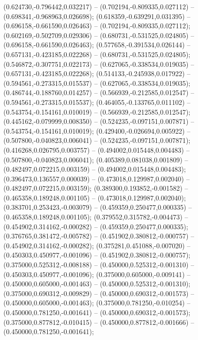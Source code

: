  (0.624730,-0.796442,0.032217) -- (0.702194,-0.809335,0.027112) -- (0.698341,-0.968963,0.026698);
 (0.618359,-0.639291,0.031395) -- (0.696158,-0.661590,0.026463) -- (0.702194,-0.809335,0.027112);
 (0.602169,-0.502709,0.029306) -- (0.680731,-0.531525,0.024805) -- (0.696158,-0.661590,0.026463);
 (0.577658,-0.391534,0.026144) -- (0.657131,-0.423185,0.022268) -- (0.680731,-0.531525,0.024805);
 (0.546872,-0.307751,0.022173) -- (0.627065,-0.338534,0.019035) -- (0.657131,-0.423185,0.022268);
 (0.514133,-0.245938,0.017922) -- (0.594561,-0.273315,0.015537) -- (0.627065,-0.338534,0.019035);
 (0.486744,-0.188760,0.014257) -- (0.566939,-0.212585,0.012547) -- (0.594561,-0.273315,0.015537);
 (0.464055,-0.133765,0.011102) -- (0.543754,-0.154161,0.010019) -- (0.566939,-0.212585,0.012547);
 (0.445162,-0.079999,0.008350) -- (0.524235,-0.097151,0.007871) -- (0.543754,-0.154161,0.010019);
 (0.429400,-0.026694,0.005922) -- (0.507800,-0.040823,0.006041) -- (0.524235,-0.097151,0.007871);
 (0.416268,0.026795,0.003757) -- (0.494002,0.015448,0.004483) -- (0.507800,-0.040823,0.006041);
 (0.405389,0.081038,0.001809) -- (0.482497,0.072215,0.003159) -- (0.494002,0.015448,0.004483);
 (0.396473,0.136557,0.000039) -- (0.473018,0.129987,0.002040) -- (0.482497,0.072215,0.003159);
 (0.389300,0.193852,-0.001582) -- (0.465358,0.189248,0.001105) -- (0.473018,0.129987,0.002040);
 (0.383701,0.253423,-0.003079) -- (0.459359,0.250477,0.000335) -- (0.465358,0.189248,0.001105);
 (0.379552,0.315782,-0.004473) -- (0.454902,0.314162,-0.000282) -- (0.459359,0.250477,0.000335);
 (0.376765,0.381472,-0.005782) -- (0.451902,0.380812,-0.000757) -- (0.454902,0.314162,-0.000282);
 (0.375281,0.451088,-0.007020) -- (0.450303,0.450977,-0.001096) -- (0.451902,0.380812,-0.000757);
 (0.375000,0.525312,-0.008188) -- (0.450000,0.525312,-0.001310) -- (0.450303,0.450977,-0.001096);
 (0.375000,0.605000,-0.009141) -- (0.450000,0.605000,-0.001463) -- (0.450000,0.525312,-0.001310);
 (0.375000,0.690312,-0.009829) -- (0.450000,0.690312,-0.001573) -- (0.450000,0.605000,-0.001463);
 (0.375000,0.781250,-0.010254) -- (0.450000,0.781250,-0.001641) -- (0.450000,0.690312,-0.001573);
 (0.375000,0.877812,-0.010415) -- (0.450000,0.877812,-0.001666) -- (0.450000,0.781250,-0.001641);
